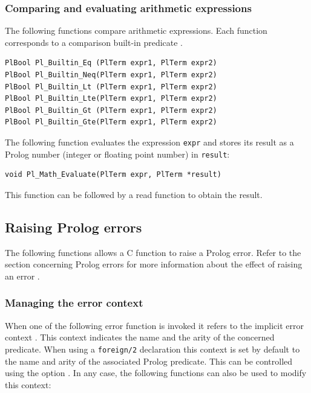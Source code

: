 \subsubsection{Comparing and evaluating arithmetic expressions}
The following functions compare arithmetic expressions. Each function
corresponds to a comparison built-in predicate .

\begin{Code}
\begin{verbatim}
PlBool Pl_Builtin_Eq (PlTerm expr1, PlTerm expr2)
PlBool Pl_Builtin_Neq(PlTerm expr1, PlTerm expr2)
PlBool Pl_Builtin_Lt (PlTerm expr1, PlTerm expr2)
PlBool Pl_Builtin_Lte(PlTerm expr1, PlTerm expr2)
PlBool Pl_Builtin_Gt (PlTerm expr1, PlTerm expr2)
PlBool Pl_Builtin_Gte(PlTerm expr1, PlTerm expr2)
\end{verbatim}
\end{Code}

The following function evaluates the expression \texttt{expr} and stores its
result as a Prolog number (integer or floating point number) in
\texttt{result}:

\begin{Code}
\begin{verbatim}
void Pl_Math_Evaluate(PlTerm expr, PlTerm *result)
\end{verbatim}
\end{Code}

This function can be followed by a read function 
to obtain the result.

\subsection{Raising Prolog errors}
\label{Raising-Prolog-errors}
The following functions allows a C function to raise a Prolog error. Refer
to the section concerning Prolog errors for more information about the
effect of raising an error .

\subsubsection{Managing the error context}
When one of the following error function is invoked it refers to the
implicit error context . This
context indicates the name and the arity of the concerned predicate. When
using a \texttt{foreign/2} declaration this context is set by default to the
name and arity of the associated Prolog predicate. This can be controlled
using the  option . In any
case, the following functions can also be used to modify this context:

